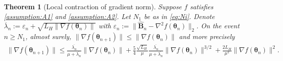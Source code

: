 \documentclass[11pt]{amsart}
\theoremstyle{plain}
\newtheorem{theorem}{Theorem}[section]
\theoremstyle{definition}
\theoremstyle{remark}
\def\eps{\varepsilon}
\def\B{\mathbf{B}}
\def\param{\boldsymbol{\theta}}
\begin{document}
\begin{theorem}[Local contraction of gradient norm]\label{thm:local_unified}
Suppose $f$ satisfies \ref{assumption:A1} and \ref{assumption:A2}.  %
Let $N_{1}$ be as in \eqref{eq:Ni}. 
Denote $\overline{\lambda}_{n}:=\eps_n+\sqrt{L_{H}\| \nabla f(\param_{n}) \|}$ with $\eps_{n}:=\| \hat{\B}_{n}-\nabla^{2}f(\param_{n}) \|_{2}$. 
On the event $n\ge N_{1}$, almost surely, $\|\nabla f(\param_{n+1})\|\leq \|\nabla f(\param_n)\|$ and more precisely 
\begin{align}\label{eq:grad_contraction}
     \|\nabla f(\param_{n+1})\|\leq \frac{\overline{\lambda_n}}{\mu+\overline{\lambda_n}}\|\nabla f(\param_n)\|+\frac{5}{4}\frac{\sqrt{L_H}}{\mu}\frac{\overline{\lambda_n}}{\mu+\overline{\lambda_n}}\|\nabla f(\param_n)\|^{3/2}+ \frac{2L_H}{\mu^2}\|\nabla f(\param_n)\|^2.
\end{align}
\end{theorem}
\end{document}
